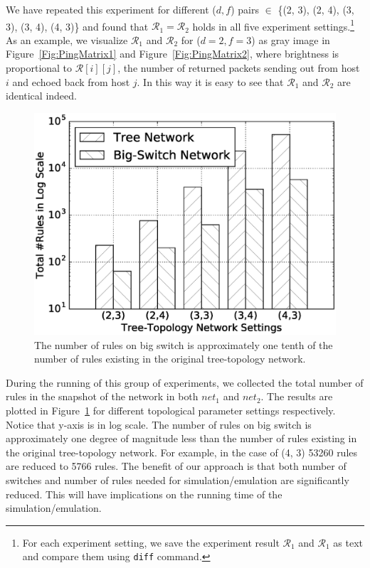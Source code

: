 We have repeated this experiment for different ($d, f$) pairs $\in$
\{(2, 3), (2, 4), (3, 3), (3, 4), (4, 3)\} and found that
$\mathcal{R}_1 = \mathcal{R}_2$ holds in all five experiment settings.\footnote{For each
experiment setting, we save the experiment result $\mathcal{R}_1$ and $\mathcal{R}_1$
as text and compare them using \texttt{diff} command.}
As an example, we visualize $\mathcal{R}_1$ and $\mathcal{R}_2$ for ($d=2, f=3$) as gray image
in Figure~\ref{Fig:PingMatrix1} and Figure~\ref{Fig:PingMatrix2},
where brightness is proportional to $\mathcal{R}[i][j]$,
the number of returned packets sending out from host $i$ and echoed back from host $j$.
In this way it is easy to see that $\mathcal{R}_1$ and $\mathcal{R}_2$ are identical indeed.


\begin{figure}[h]
\centering
\includegraphics[scale=.42]{figures/comp_num_rules.eps}
\caption{The number of rules on big switch is approximately one tenth of the
        number of rules existing in the original tree-topology network.}
\label{Fig:CompareNumRules}
\end{figure}

During the running of this group of experiments,
we collected the total number of rules in the snapshot of the network in both $net_1$
and $net_2$.
The results are plotted in Figure~\ref{Fig:CompareNumRules} for different
topological parameter settings respectively.
Notice that y-axis is in log scale.
The number of rules on big switch is approximately one degree of magnitude less
than the number of rules existing in the original tree-topology network.
For example, in the case of (4, 3) 53260 rules are reduced to 5766 rules.
The benefit of our approach is that both number of switches and number of rules needed
for simulation/emulation are significantly reduced.
This will have implications on the running time of the simulation/emulation.

